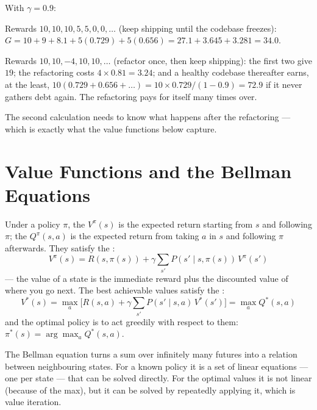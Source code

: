 \begin{worked}
With $\gamma = 0.9$:
\begin{tight}
  \item Rewards $10, 10, 10, 5, 5, 0, 0, \dots$ (keep shipping until the codebase
        freezes): $G = 10 + 9 + 8.1 + 5(0.729) + 5(0.656) = 27.1 + 3.645 + 3.281 =
        \mathbf{34.0}$.
  \item Rewards $10, 10, -4, 10, 10, \dots$ (refactor once, then keep shipping): the
        first two give $19$; the refactoring costs $4 \times 0.81 = 3.24$; and a
        healthy codebase thereafter earns, at the least, $10(0.729 + 0.656 + \dots) =
        10 \times 0.729/(1 - 0.9) = 72.9$ if it never gathers debt again. The
        refactoring pays for itself many times over.
\end{tight}
The second calculation needs to know what happens after the refactoring --- which is
exactly what the value functions below capture.
\end{worked}

\section{Value Functions and the Bellman Equations}

\begin{definitionbox}
Under a policy $\pi$, the  $V^{\pi}(s)$ is the expected return
starting from $s$ and following $\pi$; the  $Q^{\pi}(s, a)$ is the
expected return from taking $a$ in $s$ and following $\pi$ afterwards. They satisfy
the :
\[
V^{\pi}(s) = R(s, \pi(s)) + \gamma\sum_{s'} P(s' \mid s, \pi(s))\,V^{\pi}(s')
\]
--- the value of a state is the immediate reward plus the discounted value of where
you go next. The best achievable values satisfy the :
\[
V^{*}(s) = \max_{a}\Big[R(s, a) + \gamma\sum_{s'} P(s' \mid s, a)\,V^{*}(s')\Big] = \max_a Q^{*}(s, a)
\]
and the optimal policy is to act greedily with respect to them:
$\pi^{*}(s) = \arg\max_a Q^{*}(s, a)$.
\end{definitionbox}

\begin{conceptbox}
The Bellman equation turns a sum over infinitely many futures into a relation between
neighbouring states. For a known policy it is a set of linear equations --- one per
state --- that can be solved directly. For the optimal values it is not linear
(because of the max), but it can be solved by repeatedly applying it, which is value
iteration.
\end{conceptbox}

